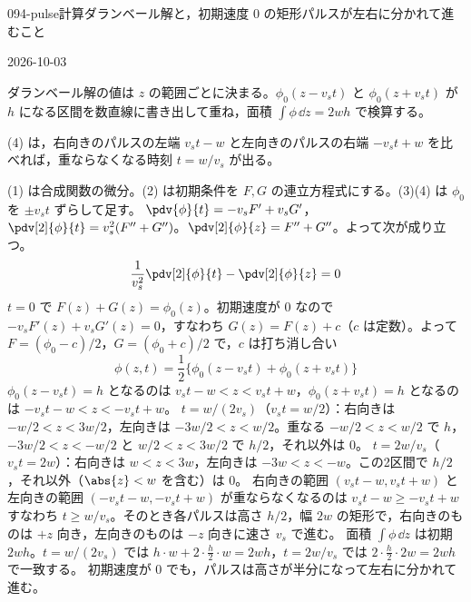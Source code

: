 \documentclass[uplatex,dvipdfmx,a4paper,11pt]{jsarticle}
\begin{document}
\begin{mondai}{094-pulse}{計算}{ダランベール解と，初期速度 0 の矩形パルスが左右に分かれて進むこと}
\begin{maekizuki}{2026-10-03}
\item ダランベール解の値は $z$ の範囲ごとに決まる。$\phi_0(z-v_st)$ と $\phi_0(z+v_st)$ が $h$ になる区間を数直線に書き出して重ね，面積 $\int\phi\,\dd z=2wh$ で検算する。
\item (4) は，右向きのパルスの左端 $v_st-w$ と左向きのパルスの右端 $-v_st+w$ を比べれば，重ならなくなる時刻 $t=w/v_s$ が出る。
\end{maekizuki}
\begin{tadashii}
\houshin (1) は合成関数の微分。(2) は初期条件を $F,G$ の連立方程式にする。(3)(4) は $\phi_0$ を $\pm v_st$ ずらして足す。
\keisan
{} $\pdv{\phi}{t}=-v_sF'+v_sG'$，$\pdv[2]{\phi}{t}=v_s^{2}(F''+G'')$。$\pdv[2]{\phi}{z}=F''+G''$。よって次が成り立つ。
\[ \frac{1}{v_s^{2}}\pdv[2]{\phi}{t}-\pdv[2]{\phi}{z}=0 \]
 $t=0$ で $F(z)+G(z)=\phi_0(z)$。初期速度が 0 なので $-v_sF'(z)+v_sG'(z)=0$，すなわち $G(z)=F(z)+c$（$c$ は定数）。よって $F=(\phi_0-c)/2$，$G=(\phi_0+c)/2$ で，$c$ は打ち消し合い
\[ \phi(z,t)=\frac{1}{2}\{\phi_0(z-v_st)+\phi_0(z+v_st)\} \]
 $\phi_0(z-v_st)=h$ となるのは $v_st-w<z<v_st+w$，$\phi_0(z+v_st)=h$ となるのは $-v_st-w<z<-v_st+w$。
$t=w/(2v_s)$（$v_st=w/2$）：右向きは $-w/2<z<3w/2$，左向きは $-3w/2<z<w/2$。重なる $-w/2<z<w/2$ で $h$，$-3w/2<z<-w/2$ と $w/2<z<3w/2$ で $h/2$，それ以外は 0。
$t=2w/v_s$（$v_st=2w$）：右向きは $w<z<3w$，左向きは $-3w<z<-w$。この2区間で $h/2$，それ以外（$\abs{z}<w$ を含む）は 0。
 右向きの範囲 $(v_st-w,v_st+w)$ と左向きの範囲 $(-v_st-w,-v_st+w)$ が重ならなくなるのは $v_st-w\ge-v_st+w$ すなわち $t\ge w/v_s$。そのとき各パルスは高さ $h/2$，幅 $2w$ の矩形で，右向きのものは $+z$ 向き，左向きのものは $-z$ 向きに速さ $v_s$ で進む。
\kenzan 面積 $\int\phi\,\dd z$ は初期 $2wh$。$t=w/(2v_s)$ では $h\cdot w+2\cdot\frac{h}{2}\cdot w=2wh$，$t=2w/v_s$ では $2\cdot\frac{h}{2}\cdot2w=2wh$ で一致する。
\tsumazuki 初期速度が 0 でも，パルスは高さが半分になって左右に分かれて進む。
\end{tadashii}
\end{mondai}
\end{document}
